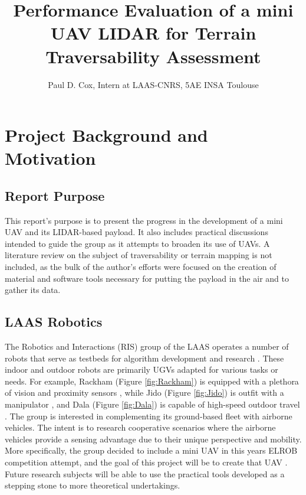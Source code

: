 \documentclass[a4paper,11pt]{report}
\title{Performance Evaluation of a mini UAV LIDAR for Terrain Traversability Assessment}
\author{Paul D. Cox, Intern at LAAS-CNRS, 5AE INSA Toulouse}
\begin{document}
\maketitle

\tableofcontents
\newpage

\chapter{Project Background and Motivation}

\section{Report Purpose}

This report's purpose is to present the progress in the development of a mini UAV and its LIDAR-based payload. It also includes practical discussions intended to guide the group as it attempts to broaden its use of UAVs. A literature review on the subject of traversability or terrain mapping is not included, as the bulk of the author's efforts were focused on the creation of material and software tools necessary for putting the payload in the air and to gather its data.

\section{LAAS Robotics}

The Robotics and Interactions (RIS) group of the LAAS operates a number of robots that serve as testbeds for algorithm development and research \cite{ugvs}. These indoor and outdoor robots are primarily UGVs adapted for various tasks or needs. For example, Rackham (Figure \ref{fig:Rackham}) is equipped with a plethora of vision and proximity sensors \cite{rackham}, while Jido (Figure \ref{fig:Jido}) is outfit with a manipulator \cite{jido}, and Dala (Figure \ref{fig:Dala}) is capable of high-speed outdoor travel \cite{dala}. The group is interested in complementing its ground-based fleet with airborne vehicles. The intent is to research cooperative scenarios where the airborne vehicles provide a sensing advantage due to their unique perspective and mobility. More specifically, the group decided to include a mini UAV in this years ELROB competition attempt, and the goal of this project will be to create that UAV \cite{this}. Future research subjects will be able to use the practical tools developed as a stepping stone to more theoretical undertakings.
\end{document}
